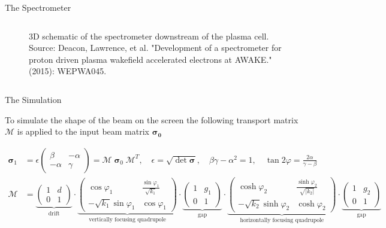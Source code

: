 \documentclass[aspectratio=169]{beamer}
\begin{document}
\begin{frame}{The Spectrometer}
\begin{columns}
\begin{column}{0.4\linewidth}
\begin{figure}[h]
				\caption{
					3D schematic of the spectrometer downstream of the
					plasma cell. Source: Deacon, Lawrence, et al. "Development of a
					spectrometer for proton driven plasma wakefield accelerated
					electrons at AWAKE." (2015): WEPWA045.
				}
			\end{figure}
		\end{column}
	\end{columns}
\end{frame}

\small
\begin{frame}{The Simulation}

	To simulate the shape of the beam on the screen the following transport
	matrix $\mathcal{M}$ is applied to the input beam matrix $\bm{\sigma_0}$

	\begin{align*}
		\bm{\sigma}_1 &=
		\epsilon
		\begin{pmatrix}
			\beta & -\alpha \\
			-\alpha & \gamma
		\end{pmatrix} =
		\mathcal{M}\;\bm{\sigma}_0\;\mathcal{M}^T, \quad
		\epsilon = \sqrt{\det{\bm{\sigma}}}, \quad
		\beta\gamma-\alpha^2=1, \quad
		\tan2\varphi = \tfrac{2\alpha}{\gamma-\beta}
		\\[1em] %
		\mathcal{M} &= \underbrace{
		\begin{pmatrix}
			1 & d \\
			0 & 1
		\end{pmatrix}}_\text{drift}
		\cdot
		\underbrace{
		\begin{pmatrix}
			\cos\varphi_1 & \tfrac{\sin\varphi_1}{\sqrt{k_1}} \\
			-\sqrt{k_1}\sin\varphi_1 & \cos\varphi_1
		\end{pmatrix}}_\text{vertically focusing quadrupole}
		\cdot
		\underbrace{
		\begin{pmatrix}
			1 & g_1 \\
			0 & 1
		\end{pmatrix}}_\text{gap}
		\cdot
		\underbrace{
		\begin{pmatrix}
			\cosh\varphi_2 & \tfrac{\sinh\varphi_2}{\sqrt{|k_2|}} \\
			-\sqrt{k_2}\sinh\varphi_2 & \cosh\varphi_2
		\end{pmatrix}}_\text{horizontally focusing quadrupole}
		\cdot
		\underbrace{
		\begin{pmatrix}
			1 & g_2 \\
			0 & 1
		\end{pmatrix}}_\text{gap}
	\end{align*}
	\\[1em]


\end{frame}
\end{document}
